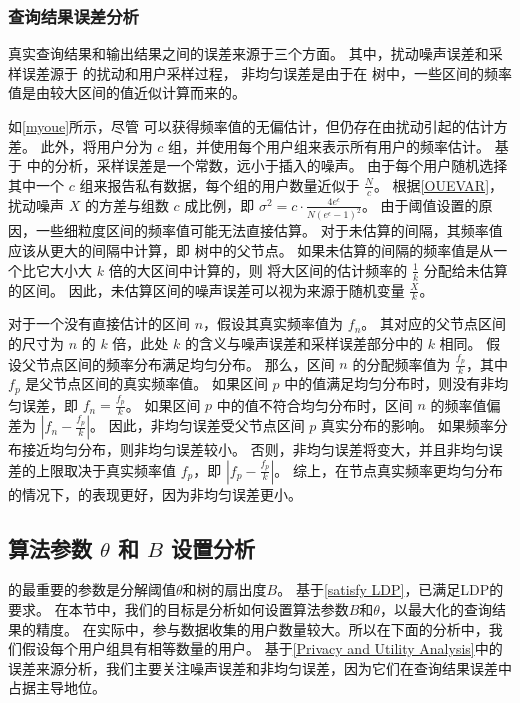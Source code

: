 \subsubsection{查询结果误差分析}
真实查询结果和\myahead 输出结果之间的误差来源于三个方面。
其中，扰动噪声误差和采样误差源于 \oue 的扰动和用户采样过程，
非均匀误差是由于在 \myahead 树中，一些区间的频率值是由较大区间的值近似计算而来的。

如\autoref{myoue}所示，尽管 \oue 可以获得频率值的无偏估计，但仍存在由扰动引起的估计方差。
此外，\myahead 将用户分为 $c$ 组，并使用每个用户组来表示所有用户的频率估计。 
基于 \cite{yang2020answering} 中的分析，采样误差是一个常数，远小于插入的噪声。
由于每个用户随机选择其中一个 $c$ 组来报告私有数据，每个组的用户数量近似于 $\frac{N}{c}$。
根据\autoref{OUEVAR}，扰动噪声 $X$ 的方差与组数 $c$ 成比例，即 $\sigma^2 = c \cdot \frac{4e^{\epsilon}}{N\left(e^{\epsilon}-1\right)^{2}}$。
由于阈值设置的原因，一些细粒度区间的频率值可能无法直接估算。
对于未估算的间隔，其频率值应该从更大的间隔中计算，即 \myahead 树中的父节点。
如果未估算的间隔的频率值是从一个比它大小大 $k$ 倍的大区间中计算的，则 \myahead 将大区间的估计频率的 $\frac{1}{k}$ 分配给未估算的区间。
因此，未估算区间的噪声误差可以视为来源于随机变量 $\frac{X}{k}$。

对于一个没有直接估计的区间 $n$，假设其真实频率值为 $f_n$。
其对应的父节点区间的尺寸为 $n$ 的 $k$ 倍，此处 $k$ 的含义与噪声误差和采样误差部分中的 $k$ 相同。
假设父节点区间的频率分布满足均匀分布\cite{qardaji2013differentially}。
那么，区间 $n$ 的分配频率值为 $\frac{f_p}{k}$，其中 $f_p$ 是父节点区间的真实频率值。
如果区间 $p$ 中的值满足均匀分布时，则没有非均匀误差，即 $f_n = \frac{f_p}{k}$。
如果区间 $p$ 中的值不符合均匀分布时，区间 $n$ 的频率值偏差为 $|f_n - \frac{f_p}{k}|$。
因此，非均匀误差受父节点区间 $p$ 真实分布的影响。
如果频率分布接近均匀分布，则非均匀误差较小。
否则，非均匀误差将变大，并且非均匀误差的上限取决于真实频率值 $f_p$，即 $|f_p - \frac{f_p}{k}|$。
综上，在节点真实频率更均匀分布的情况下，\myahead 的表现更好，因为非均匀误差更小。



\subsection{算法参数 $\theta$ 和 $B$ 设置分析}
\label{Selection parameters}
\myahead 的最重要的参数是分解阈值$\theta$和树的扇出度$B$。
基于\autoref{satisfy LDP}，\myahead 已满足LDP的要求。
在本节中，我们的目标是分析如何设置算法参数$B$和$\theta$，以最大化\myahead 的查询结果的精度。
在实际中，参与数据收集的用户数量较大。所以在下面的分析中，我们假设每个用户组具有相等数量的用户。
基于\autoref{Privacy and Utility Analysis}中的误差来源分析，我们主要关注噪声误差和非均匀误差，因为它们在查询结果误差中占据主导地位。

